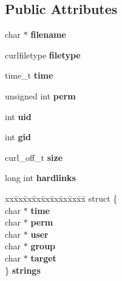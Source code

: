 \subsection*{Public Attributes}
\begin{DoxyCompactItemize}
\item 
\mbox{\label{structcurl__fileinfo_a2d4968eb52f071105b63c161dd948c31}} 
char $\ast$ {\bfseries filename}
\item 
\mbox{\label{structcurl__fileinfo_a69b09df292a2f8a749ffd24f172b0bde}} 
curlfiletype {\bfseries filetype}
\item 
\mbox{\label{structcurl__fileinfo_a5136db1360519440e97f481a9a05da0f}} 
time\+\_\+t {\bfseries time}
\item 
\mbox{\label{structcurl__fileinfo_a48e688d2b2feee03da8ae21924f3b97b}} 
unsigned int {\bfseries perm}
\item 
\mbox{\label{structcurl__fileinfo_aa6fed17f82b0137397ebcb7b35c4c100}} 
int {\bfseries uid}
\item 
\mbox{\label{structcurl__fileinfo_ab4833a1bcdb0c29421f7c53c30c3fc1e}} 
int {\bfseries gid}
\item 
\mbox{\label{structcurl__fileinfo_a23e38e1ca497cb7a140d9aff92f33fc0}} 
curl\+\_\+off\+\_\+t {\bfseries size}
\item 
\mbox{\label{structcurl__fileinfo_ab77d9241666cf7c216b8d12e4b55efef}} 
long int {\bfseries hardlinks}
\item 
\mbox{\label{structcurl__fileinfo_a1223fc61d5a67f631622b09e3545af2a}} 
\begin{tabbing}
xx\=xx\=xx\=xx\=xx\=xx\=xx\=xx\=xx\=\kill
struct \{\\
\>char $\ast$ {\bfseries time}\\
\>char $\ast$ {\bfseries perm}\\
\>char $\ast$ {\bfseries user}\\
\>char $\ast$ {\bfseries group}\\
\>char $\ast$ {\bfseries target}\\
\} {\bfseries strings}\\


\end{tabbing}
\end{DoxyCompactItemize}
